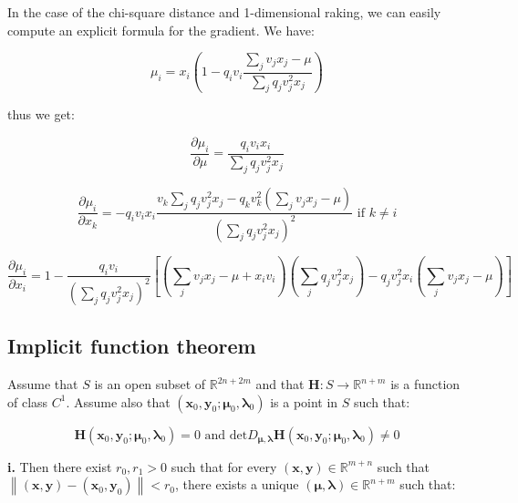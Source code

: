 \documentclass{tex/note}
\begin{document}
In the case of the chi-square distance and 1-dimensional raking, we can easily compute an explicit formula for the gradient. We have:

\begin{equation*}
\mu_i = x_i \left( 1 - q_i v_i \frac{\sum_j v_j x_j - \mu}{\sum_j q_j v_j^2 x_j} \right)
\end{equation*}

thus we get:

\begin{equation*}
\frac{\partial \mu_i}{\partial \mu} = \frac{q_i v_i x_i}{\sum_j q_j v_j^2 x_j}
\end{equation*}

\begin{equation*}
\frac{\partial \mu_i}{\partial x_k} = - q_i v_i x_i \frac{v_k \sum_j q_j v_j^2 x_j - q_k v_k^2 \left( \sum_j v_j x_j - \mu \right)}{\left( \sum_j q_j v_j^2 x_j \right)^2} \text{ if } k \neq i
\end{equation*}

\begin{equation*}
\frac{\partial \mu_i}{\partial x_i} = 1 - \frac{q_i v_i}{\left( \sum_j q_j v_j^2 x_j \right)^2} \left[ \left( \sum_j v_j x_j - \mu + x_i v_i \right) \left( \sum_j q_j v_j^2 x_j \right) - q_j v_j^2 x_i \left( \sum_j v_j x_j - \mu \right) \right]
\end{equation*}

\subsection{Implicit function theorem}

Assume that $S$ is an open subset of $\mathbb{R}^{2 n + 2 m}$ and that $\bm{H} : S \rightarrow \mathbb{R}^{n + m}$ is a function of class $C^1$. Assume also that $\left( \bm{x}_0 , \bm{y}_0 ; \bm{\mu}_0, \bm{\lambda}_0 \right)$ is a point in $S$ such that:

\begin{equation*}
\bm{H} \left( \bm{x}_0 , \bm{y}_0 ; \bm{\mu}_0, \bm{\lambda}_0 \right) = 0 \text{ and } \text{det} D_{\bm{\mu} , \bm{\lambda}} \bm{H} \left( \bm{x}_0 , \bm{y}_0 ; \bm{\mu}_0, \bm{\lambda}_0 \right) \neq 0
\end{equation*}

\textbf{i.} Then there exist $r_0 , r_1 > 0$ such that for every $\left( \bm{x} , \bm{y} \right) \in \mathbb{R}^{m + n}$ such that $\left\lVert \left( \bm{x} , \bm{y} \right) - \left( \bm{x}_0 , \bm{y}_0 \right) \right\rVert < r_0$, there exists a unique $\left( \bm{\mu} , \bm{\lambda} \right) \in \mathbb{R}^{n + m}$ such that:
\end{document}
